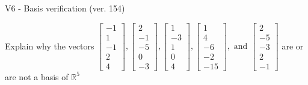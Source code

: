 \begin{exercise}
  \begin{exerciseTitle}V6 - Basis verification (ver. 154)\end{exerciseTitle}
  \begin{exerciseStatement}
    Explain why the vectors \(\left[\begin{array}{r}
-1 \\
1 \\
-1 \\
2 \\
4
\end{array}\right] , \left[\begin{array}{r}
2 \\
-1 \\
-5 \\
0 \\
-3
\end{array}\right] , \left[\begin{array}{r}
1 \\
-3 \\
1 \\
0 \\
4
\end{array}\right] , \left[\begin{array}{r}
1 \\
4 \\
-6 \\
-2 \\
-15
\end{array}\right] , \text{ and } \left[\begin{array}{r}
2 \\
-5 \\
-3 \\
2 \\
-1
\end{array}\right]\) are or are not a basis of \(\mathbb{R}^5\)	



\end{exerciseStatement}
\end{exercise}

